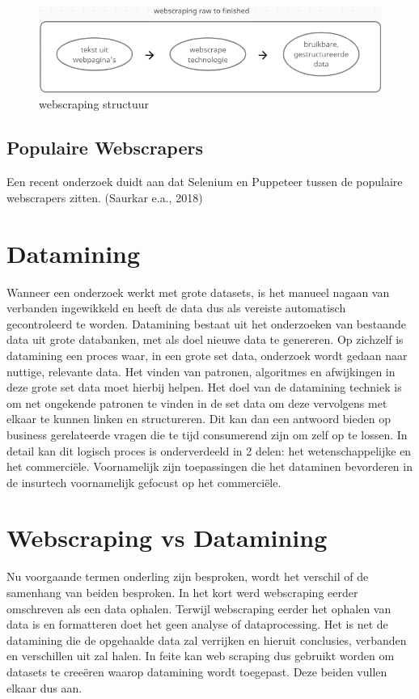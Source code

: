 \begin{figure}[bH]
	\centering
	\includegraphics{webscraping_cycle}
	\caption{webscraping structuur}
\end{figure}

\subsection{Populaire Webscrapers}

Een recent onderzoek duidt aan dat Selenium en Puppeteer tussen de populaire webscrapers zitten. (Saurkar e.a., 2018)

\section{Datamining}

Wanneer een onderzoek werkt met grote datasets, is het manueel nagaan van verbanden ingewikkeld en heeft de data dus als vereiste automatisch gecontroleerd te worden.
Datamining bestaat uit het onderzoeken van bestaande data uit grote databanken, met als doel nieuwe data te genereren.
Op zichzelf is datamining een proces waar, in een grote set data, onderzoek wordt gedaan naar nuttige, relevante data. Het vinden van patronen, algoritmes en afwijkingen in deze grote set data moet hierbij helpen. Het doel van de datamining techniek is om net ongekende patronen te vinden in de set data om deze vervolgens met elkaar te kunnen linken en structureren. Dit kan dan een antwoord bieden op business gerelateerde vragen die te tijd consumerend zijn om zelf op te lossen. \autocite{osman2019data} In detail kan dit logisch proces is onderverdeeld in 2 delen: het wetenschappelijke en het commerciële. Voornamelijk zijn toepassingen die het dataminen bevorderen in de insurtech voornamelijk gefocust op het commerciële. \autocite{hand2007principles}

\section{Webscraping vs Datamining}

Nu voorgaande termen onderling zijn besproken, wordt het verschil of de samenhang van beiden besproken. In het kort werd webscraping eerder omschreven als een data ophalen.  Terwijl webscraping eerder het ophalen van data is en formatteren doet het geen analyse of dataprocessing. Het is net de datamining die de opgehaalde data zal verrijken en hieruit conclusies, verbanden en verschillen uit zal halen. In feite kan web scraping dus gebruikt worden om datasets te creeëren waarop datamining wordt toegepast. Deze beiden vullen elkaar dus aan.


